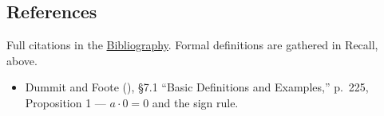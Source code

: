 \subsection{References}\label{sec:09-ring-theorems:01-setup:3}

Full citations in the \hyperref[sec:root:bibliography:1]{Bibliography}. Formal definitions are gathered in Recall, above.

\begin{itemize}
\tightlist
\item
  Dummit and Foote (\cite{DummitFoote2003}), §7.1 ``Basic Definitions and Examples,'' p.~225, Proposition 1 --- \(a \cdot 0 = 0\) and the sign rule.
\end{itemize}
